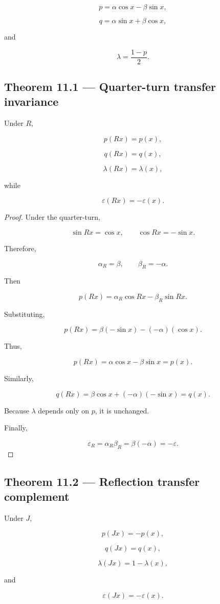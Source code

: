 \documentclass[11pt,oneside,openany]{book}
\newcommand{\PCsubsection}[1]{%
  \subsection*{#1}%
}
\begin{document}
\[
p=\alpha\cos x-\beta\sin x,
\]

\[
q=\alpha\sin x+\beta\cos x,
\]

and

\[
\lambda=\frac{1-p}{2}.
\]

\PCsubsection{Theorem 11.1 --- Quarter-turn transfer invariance}

Under \(R\),

\[
\boxed{ p(Rx)=p(x), }
\]

\[
\boxed{ q(Rx)=q(x), }
\]

\[
\boxed{ \lambda(Rx)=\lambda(x), }
\]

while

\[
\boxed{ \varepsilon(Rx)=-\varepsilon(x). }
\]

\begin{proof}
Under the quarter-turn,

\[
\sin Rx=\cos x, \qquad \cos Rx=-\sin x.
\]

Therefore,

\[
\alpha_R=\beta, \qquad \beta_R=-\alpha.
\]

Then

\[
p(Rx) = \alpha_R\cos Rx-\beta_R\sin Rx.
\]

Substituting,

\[
p(Rx) = \beta(-\sin x)-(-\alpha)(\cos x).
\]

Thus,

\[
p(Rx) = \alpha\cos x-\beta\sin x = p(x).
\]

Similarly,

\[
q(Rx) = \beta\cos x+(-\alpha)(-\sin x) = q(x).
\]

Because \(\lambda\) depends only on \(p\), it is unchanged.

Finally,

\[
\varepsilon_R = \alpha_R\beta_R = \beta(-\alpha) = -\varepsilon.
\]

\end{proof}

\PCsubsection{Theorem 11.2 --- Reflection transfer complement}

Under \(J\),

\[
\boxed{ p(Jx)=-p(x), }
\]

\[
\boxed{ q(Jx)=q(x), }
\]

\[
\boxed{ \lambda(Jx)=1-\lambda(x), }
\]

and

\[
\boxed{ \varepsilon(Jx)=-\varepsilon(x). }
\]
\end{document}
